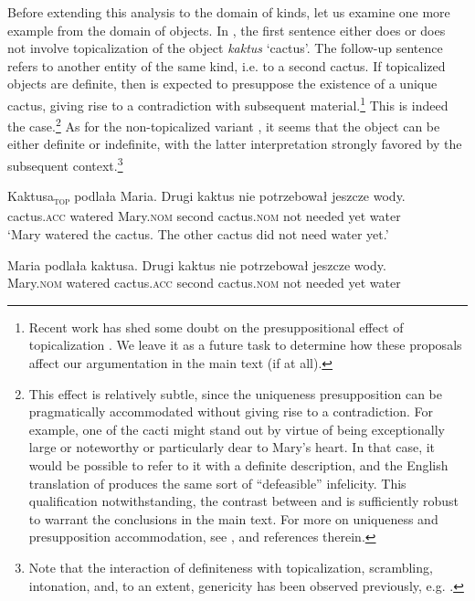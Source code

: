 \documentclass[output=paper,
colorlinks,
citecolor=brown,
newtxmath
]{langscibook}
\begin{document}
\noindent Before extending this analysis to the domain of kinds, let us examine one more example from the domain of objects. In , the first sentence either does  or does not  involve topicalization of the object \textit{kaktus} `cactus'. The follow-up sentence refers to another entity of the same kind, i.e. to a second cactus. If topicalized objects are definite, then  is expected to presuppose the existence of a unique cactus, giving rise to a contradiction with subsequent material.\footnote{Recent work has shed some doubt on the presuppositional effect of topicalization \citep{Seres.Borik2021, Simik.Demian2020}. We leave it as a future task to determine how these proposals affect our argumentation in the main text (if at all).} This is indeed the case.\footnote{This effect is relatively subtle, since the uniqueness presupposition can be pragmatically accommodated without giving rise to a contradiction. For example, one of the cacti might stand out by virtue of being exceptionally large or noteworthy or particularly dear to Mary's heart. In that case, it would be possible to refer to it with a definite description, and the English translation of  produces the same sort of ``defeasible'' infelicity. This qualification notwithstanding, the contrast between  and  is sufficiently robust to warrant the conclusions in the main text. For more on uniqueness and presupposition accommodation, see \citet{Frazier2006}, \citet{VonFintel2008} and references therein.} As for the non-topicalized variant , it seems that the object can be either definite or indefinite, with the latter interpretation strongly favored by the subsequent context.\footnote{Note that the interaction of definiteness with topicalization, scrambling, intonation, and, to an extent, genericity has been observed previously, e.g. \citet{Szwedek1974}.}

\ea \label{ex:cactus}
\ea \gll
Kaktusa\textsubscript{\textsc{top}} podlała Maria. \minsp{\#} Drugi kaktus nie potrzebował jeszcze wody.\\
cactus.\textsc{acc} watered Mary.\textsc{nom} {} second cactus.\textsc{nom} not needed yet water\\

\glt `Mary watered the cactus. The other cactus did not need water yet.' \label{ex:cactus_1}

\ex \gll
Maria podlała kaktusa. Drugi kaktus nie potrzebował jeszcze wody.\\
Mary.\textsc{nom} watered cactus.\textsc{acc} second cactus.\textsc{nom} not needed yet water\\
\end{document}
